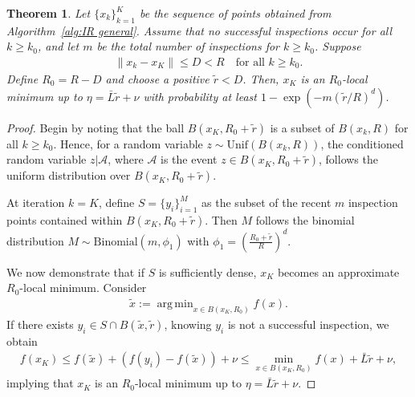 \documentclass[sn-mathphys,Numbered]{sn-jnl}
\theoremstyle{thmstyleone}
\newtheorem{theorem}{Theorem}
\theoremstyle{thmstyletwo}
\theoremstyle{thmstylethree}
\DeclareMathOperator*{\argmin}{arg\,min}
\begin{document}
\begin{theorem} \label{thm: high prob guarantee of an approx. R-local min}
    Let $\{x_k\}_{k=1}^{K}$ be the sequence of points obtained from Algorithm~\ref{alg:IR general}. Assume that no successful inspections occur for all $k \geq k_0$, and let $m$ be the total number of inspections for $k \geq k_0$. Suppose
    \begin{align*}
        \|x_{k} - x_K\| \leq D < R \quad \text{for all } k \geq k_0.
    \end{align*}
    Define $R_0 = R-D$ and choose a positive $\tilde{r} < D$. Then, $x_K$ is an $R_0$-local minimum up to $\eta = \bar{L}\tilde{r} + \nu$ with probability at least $1-\exp(- m (\tilde{r}/R)^d)$.
\end{theorem}
\begin{proof}
    Begin by noting that the ball $B(x_K, R_0 + \tilde{r})$ is a subset of $B(x_{k}, R)$ for all $k \geq k_0$. Hence, for a random variable $z \sim \mathrm{Unif}(B(x_{k}, R))$, the conditioned random variable $z|\mathcal{A}$, where $\mathcal{A}$ is the event $z \in B(x_K, R_0 + \tilde{r})$, follows the uniform distribution over $B(x_K, R_0 + \tilde{r})$.

    At iteration $k= K$, define $S = \{y_i\}_{i=1}^{M}$ as the subset of the recent $m$ inspection points contained within $B(x_K, R_0 + \tilde{r})$. Then $M$ follows the binomial distribution $M \sim \mathrm{Binomial}( m , \phi_1)$ with $\phi_1 = \left(\frac{R_0  + \tilde{r}}{R}\right)^d$.
    
    We now demonstrate that if $S$ is sufficiently dense, $x_K$ becomes an approximate $R_0$-local minimum. Consider
    \begin{align*}
        \tilde{x} := \argmin_{x \in B(x_K, R_0)} f(x).
    \end{align*}
    If there exists $y_i \in S \cap B(\tilde{x},\tilde{r})$, knowing $y_i$ is not a successful inspection, we obtain 
    \begin{align*}
        f(x_K) \leq f(\tilde{x}) + (f(y_i) - f(\tilde{x})) + \nu
        \leq \min_{x \in B(x_K, R_0)}f(x) + \bar{L} \tilde{r} + \nu,
    \end{align*}
    implying that $x_K$ is an $R_0$-local minimum up to $\eta = \bar{L}\tilde{r} + \nu$.
    

\end{proof}
\end{document}
